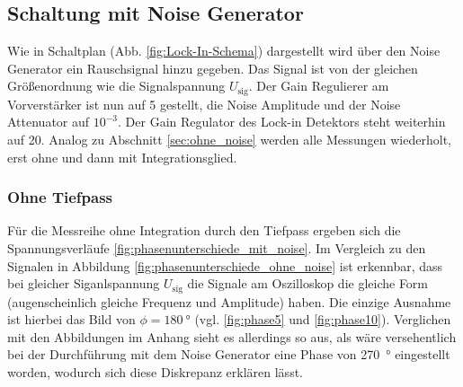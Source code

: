 \subsection{Schaltung mit Noise Generator}
\label{sec:mit_noise}
Wie in Schaltplan (Abb. \ref{fig:Lock-In-Schema}) dargestellt wird über den Noise Generator ein Rauschsignal hinzu gegeben.
Das Signal ist von der gleichen Größenordnung wie die Signalspannung $U_\text{sig}$.
Der Gain Regulierer am Vorverstärker ist nun auf 5 gestellt, die Noise Amplitude und der Noise Attenuator auf $10^{-3}$.
Der Gain Regulator des Lock-in Detektors steht weiterhin auf 20.
Analog zu Abschnitt \ref{sec:ohne_noise} werden alle Messungen wiederholt, erst ohne und dann mit Integrationsglied.


\subsubsection{Ohne Tiefpass}
\label{sec:mit_noise_ohne_tp}
Für die Messreihe ohne Integration durch den Tiefpass ergeben sich die Spannungsverläufe \ref{fig:phasenunterschiede_mit_noise}.
Im Vergleich zu den Signalen in Abbildung \ref{fig:phasenunterschiede_ohne_noise} ist erkennbar, dass bei gleicher Siganlspannung $U_\text{sig}$
die Signale am Oszilloskop die gleiche Form (augenscheinlich gleiche Frequenz und Amplitude) haben.
Die einzige Ausnahme ist hierbei das Bild von $\phi = \qty[]{180}{\degree}$ (vgl. \ref{fig:phase5} und \ref{fig:phase10}).
Verglichen mit den Abbildungen im Anhang sieht es allerdings so aus, als wäre versehentlich bei der Durchführung mit dem Noise Generator eine Phase von 
\qty[]{270}{\degree} eingestellt worden, wodurch sich diese Diskrepanz erklären lässt.
%
%
